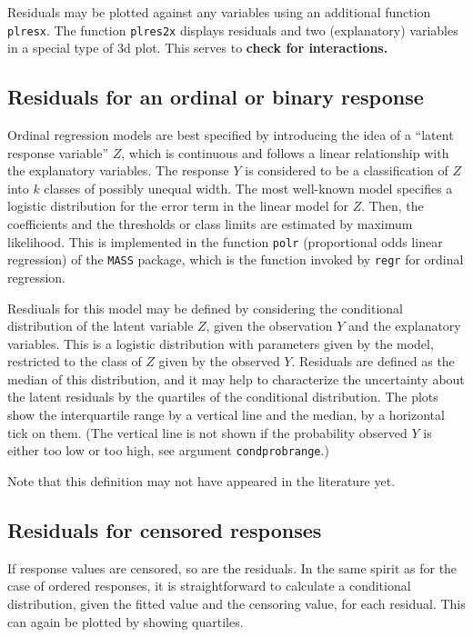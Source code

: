 \documentclass{article}
\providecommand{\T}{\texttt}
\providecommand{\ul}{\textbf}
\begin{document}
Residuals may be plotted against any variables using an additional function 
\T{plresx}. The function \T{plres2x} displays residuals and two
(explanatory) variables in a special type of 3d plot. This serves to 
\ul{check for interactions.}

\subsection{Residuals for an ordinal or binary response}
Ordinal regression models are best specified by introducing the idea of a 
``latent response variable'' $Z$, which is continuous and follows a linear
relationship with the explanatory variables. 
The response $Y$ is considered to be a classification of $Z$ into $k$
classes of possibly unequal width. The most well-known model specifies a 
logistic distribution for the error term in the linear model for $Z$.
Then, the coefficients and the thresholds or class limits are estimated by
maximum likelihood. This is implemented in the function \T{polr} 
(proportional odds linear regression) of the \T{MASS} package, 
which is the function invoked by \T{regr} for ordinal regression.

Resdiuals for this model may be defined by considering the conditional
distribution of the latent variable $Z$, given the observation $Y$ and the
explanatory variables. This is a logistic distribution with parameters
given by the model, restricted to the class of $Z$ given by the observed
$Y$. Residuals are defined as the median of this distribution, and 
it may help to characterize the uncertainty about the latent residuals by 
the quartiles of the conditional distribution.
The plots show the interquartile range by a vertical line and the median,
by a horizontal tick on them. (The vertical line is not shown if the 
probability observed $Y$ is either too low or too high, see argument
\T{condprobrange}.)

Note that this definition may not have appeared in the literature yet.

\subsection{Residuals for censored responses}
If response values are censored, so are the residuals. In the same spirit
as for the case of ordered responses, it is straightforward to calculate 
a conditional distribution, given the fitted value and the censoring value,
for each residual. This can again be plotted by showing quartiles.
\end{document}
